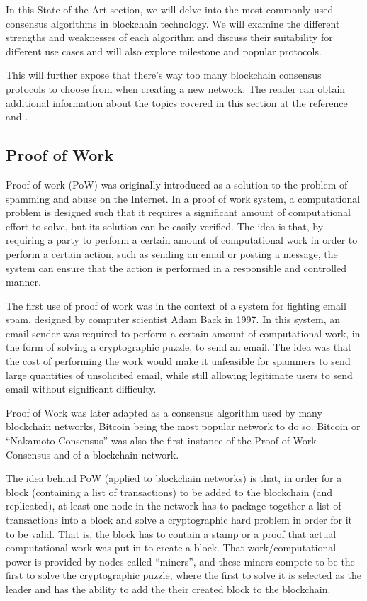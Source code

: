 In this State of the Art section, we will delve into the most commonly used consensus algorithms in blockchain technology. We will examine the different strengths and weaknesses of each algorithm and discuss their suitability for different use cases and will also explore milestone and popular protocols.

This will further expose that there's way too many blockchain consensus protocols to choose from when creating a new network.
The reader can obtain additional information about the topics covered in this section at the reference \cite{xu2023survey} and \cite{ferdous2020blockchain}.


\subsection*{\textbf{Proof of Work}}

Proof of work (PoW) \cite{back2002hashcash} was originally introduced as a solution to the problem of spamming and abuse on the Internet. In a proof of work system, a computational problem is designed such that it requires a significant amount of computational effort to solve, but its solution can be easily verified. The idea is that, by requiring a party to perform a certain amount of computational work in order to perform a certain action, such as sending an email or posting a message, the system can ensure that the action is performed in a responsible and controlled manner.

The first use of proof of work was in the context of a system for fighting email spam, designed by computer scientist Adam Back in 1997. In this system, an email sender was required to perform a certain amount of computational work, in the form of solving a cryptographic puzzle, to send an email. The idea was that the cost of performing the work would make it unfeasible for spammers to send large quantities of unsolicited email, while still allowing legitimate users to send email without significant difficulty.


Proof of Work was later adapted as a consensus algorithm used by many blockchain networks, Bitcoin \cite{nakamoto2008bitcoin} being the most popular network to do so.
Bitcoin or ``Nakamoto Consensus'' was also the first instance of the Proof of Work Consensus and of a blockchain network.

The idea behind PoW (applied to blockchain networks) is that, in order for a block (containing a list of transactions) to be added to the blockchain (and replicated), at least one node in the network has to package together a list of transactions into a block and solve a cryptographic hard problem in order for it to be valid.
That is, the block has to contain a stamp or a proof that actual computational work was put in to create a block.
That work/computational power is provided by nodes called ``miners'', and these miners compete to be the first to solve the cryptographic puzzle, where the first to solve it is selected as the leader and has the ability to add the their created block to the blockchain.

